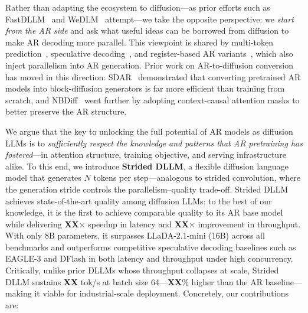 Rather than adapting the ecosystem to diffusion---as prior efforts such as FastDLLM~\citep{fastdllm2025} and WeDLM~\citep{wedlm2025} attempt---we take the opposite perspective: we \emph{start from the AR side} and ask what useful ideas can be borrowed from diffusion to make AR decoding more parallel. This viewpoint is shared by multi-token prediction~\citep{gloeckle2024mtp, deepseekv3}, speculative decoding~\citep{leviathan2023speculative, eagle3}, and register-based AR variants~\citep{cllms2024}, which also inject parallelism into AR generation.
Prior work on AR-to-diffusion conversion has moved in this direction: SDAR~\citep{sdar2025} demonstrated that converting pretrained AR models into block-diffusion generators is far more efficient than training from scratch, and NBDiff~\citep{nbdiff2025} went further by adopting context-causal attention masks to better preserve the AR structure. 

We argue that the key to unlocking the full potential of AR models as diffusion LLMs is to \emph{sufficiently respect the knowledge and patterns that AR pretraining has fostered}---in attention structure, training objective, and serving infrastructure alike. To this end, we introduce \textbf{Strided DLLM}, a flexible diffusion language model that generates $N$ tokens per step---analogous to strided convolution, where the generation stride controls the parallelism--quality trade-off. Strided DLLM achieves state-of-the-art quality among diffusion LLMs: to the best of our knowledge, it is the first to achieve comparable quality to its AR base model while delivering \textbf{XX}$\times$ speedup in latency and \textbf{XX}$\times$ improvement in throughput. With only 8B parameters, it surpasses LLaDA-2.1-mini (16B) across all benchmarks and outperforms competitive speculative decoding baselines such as EAGLE-3 and DFlash in both latency and throughput under high concurrency. Critically, unlike prior DLLMs whose throughput collapses at scale, Strided DLLM sustains \textbf{XX} tok/s at batch size 64---\textbf{XX}\% higher than the AR baseline---making it viable for industrial-scale deployment. Concretely, our contributions are:

